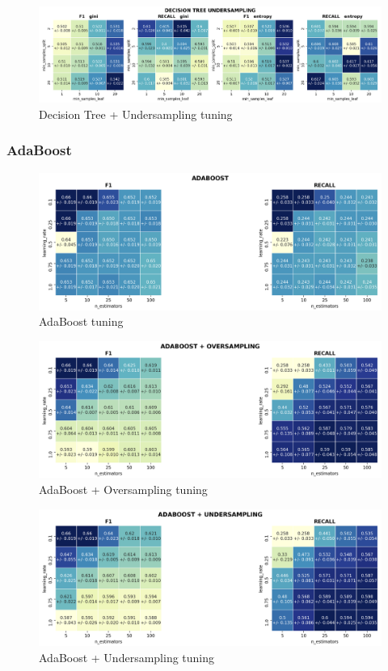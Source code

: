 \documentclass{article}
\begin{document}
	\begin{figure}[H]
		\centering
		\includegraphics[width=.9\textwidth]{clf_img/DecisionTree_US.png}
		\caption{Decision Tree + Undersampling tuning}
		\label{fig:hyper_dectreeUS}
	\end{figure}
	
	
	\subsubsection{AdaBoost}
	\begin{figure}[H]
		\centering
		\includegraphics[width=.8\textwidth]{clf_img/Adaboost.png}
		\caption{AdaBoost tuning}
		\label{fig:hyper_ada}
	\end{figure}
	
	\begin{figure}[H]
		\centering
		\includegraphics[width=.8\textwidth]{clf_img/Adaboost_OS.png}
		\caption{AdaBoost + Oversampling tuning}
		\label{fig:hyper_adaOS}
	\end{figure}
	
	\begin{figure}[H]
		\centering
		\includegraphics[width=.8\textwidth]{clf_img/Adaboost_US.png}
		\caption{AdaBoost + Undersampling tuning}
		\label{fig:hyper_adaUS}
	\end{figure}
	
\end{document}
